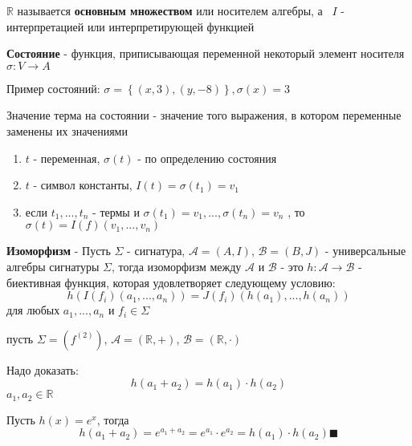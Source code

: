 \documentclass[../main/document.tex]{subfiles}
\begin{document}
\begin{dfn}
$\mathbb{R}$ называется \textbf{основным множеством} или носителем алгебры, а \
$I$ - интерпретацией или интерпретирующей функцией
\end{dfn}

\begin{dfn}[Состояние]
\textbf{Состояние} - функция, приписывающая переменной некоторый элемент носителя $\sigma :V\rightarrow A$
\end{dfn}

\begin{exm}
Пример состояний: $\sigma = \left\{(x,3),(y,-8)\right\}, \sigma(x)=3$
\end{exm}

\begin{dfn}
Значение терма на состоянии - значение того выражения, в котором переменные заменены их значениями

\begin{enumerate}
\item $t$ - переменная, $\sigma(t)$ - по определению состояния
\item $t$ - символ константы, $I(t)=\sigma(t_1)=v_1$
\item если $t_1,...,t_n$ - термы и $\sigma(t_1)=v_1,...,\sigma(t_n)=v_n$ , то $\sigma(t)=I(f)(v_1,...,v_n)$
\end{enumerate}
\end{dfn}
\begin{dfn}[Изоморфизм]
\textbf{Изоморфизм} - Пусть $\Sigma$ - сигнатура, $\mathcal{A}=(A,I)$, $\mathcal{B}=(B,J)$ - универсальные алгебры сигнатуры $\Sigma$, тогда изоморфизм между $\mathcal{A}$ и $\mathcal{B}$ - это $h:\mathcal{A}\rightarrow \mathcal{B}$ - биективная функция, которая удовлетворяет следующему условию:
$$h(I(f_i)(a_1,...,a_n))=J(f_i)(h(a_1),...,h(a_n))$$
для любых $a_1,...,a_n$ и $f_i\in \Sigma$
\end{dfn}

\begin{exm}
пусть $\Sigma=(f^{(2)})$, $\mathcal{A}=(\mathbb{R},+)$, $\mathcal{B}=(\mathbb{R},\cdot)$

Надо доказать: 
$$h(a_1+a_2)=h(a_1)\cdot h(a_2)$$
$a_1,a_2\in \mathbb{R}$

Пусть $h(x)=e^x$, тогда
$$h(a_1+a_2)=e^{a_1+a_2}=e^{a_1}\cdot e^{a_2}=h(a_1)\cdot h(a_2)\blacksquare$$
\end{exm}
\end{document}
